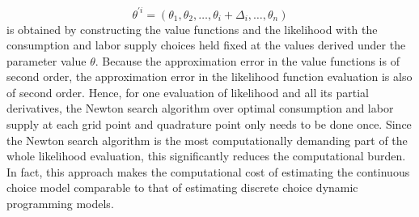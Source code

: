 \documentclass[\econtexRoot/ImaiKeane]{subfiles}
\begin{document}
$$\theta^{'i} = (\theta_1,\theta_2, \dots, \theta_i + \Delta_i, \dots, \theta_n)$$
is obtained by constructing the value functions and the likelihood with the consumption and labor supply choices held fixed at the values derived under the parameter value $\theta$. Because the approximation error in the value functions is of second order, the approximation error in the likelihood function evaluation is also of second order. Hence, for one evaluation of likelihood and all its partial derivatives, the Newton search algorithm over optimal consumption and labor supply at each grid point and quadrature point only needs to be done once. Since the Newton search algorithm is the most computationally demanding part of the whole likelihood evaluation, this significantly reduces the computational burden. In fact, this approach makes the computational cost of estimating the continuous choice model comparable to that of estimating discrete choice dynamic programming models.
\end{document}
